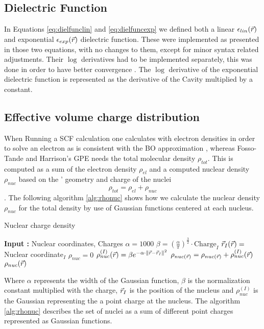 \documentclass[../master_thesis.tex]{subfiles}
\begin{document}
\subsection{Dielectric Function}
In Equations \ref{eq:dielfunclin} and \ref{eq:dielfuncexp} we defined both a
linear $\epsilon_{lin}(\vec{r})$ and exponential $\epsilon_{exp}(\vec{r})$ dielectric function. These were implemented as presented
in those two equations, with no changes to them, except for minor syntax related
adjustments. Their $\log$ derivatives had to be implemented separately,
this was done in order to have better convergence \cite{FossoTande:2013ka}. The
$\log$ derivative of the exponential dielectric function is represented as the
derivative of the Cavity multiplied by a constant.

\subsection{Effective volume charge distribution}
When Running a \ac{SCF} calculation one calculates with electron densities in order
to solve an electron \SE as is consistent with the \ac{BO} approximation
\cite{Cramer:2004, Konishi:2009}, whereas Fosso-Tande and Harrison's \ac{GPE}
needs the total molecular density $\rho_{tot}$. This is computed as a sum of the electron
density $\rho_{el}$ and a computed nuclear density $\rho_{nuc}$ based on the '
geometry and charge of the nuclei
\begin{equation}
  \rho_{tot} = \rho_{el} + \rho_{nuc}
\end{equation}.
The following algorithm \ref{alg:rhonuc} shows how we calculate the nuclear
density $\rho_{nuc}$ for the total density by use of Gaussian functions centered at
each nucleus.
\begin{algorithm}
  \caption{Nuclear charge density}\label{alg:rhonuc}
  \begin{algorithmic}
    \STATE \textbf{Input :} Nuclear coordinates, Charges
    \STATE $\alpha = 1000$
    \STATE $\beta = (\frac{\alpha}{\pi})^{\frac{3}{2}} \cdot \text{Charge}_I$
    \STATE $\vec{r}_I(\vec{r}) =$ Nuclear coordinate$_I$
    \STATE $\rho_{nuc} = 0$
    \STATE $\rho_{nuc}^{(I)}(\vec{r}) = \beta e^{-\alpha\cdot\lVert\vec{r} -\vec{r}_I\rVert^2}$
    \STATE $\rho_{nuc(\vec{r})} = \rho_{nuc(\vec{r})} + \rho_{nuc}^{(I)}(\vec{r})$
    \ENDFOR
    \RETURN $\rho_{nuc}(\vec{r})$
  \end{algorithmic}
\end{algorithm}

Where $\alpha$ represents the width of the Gaussian function, $\beta$ is the normalization
constant multiplied with the charge, $\vec{r}_I$ is the position of the nucleus and
$\rho_{nuc}^{(I)}$ is the Gaussian representing the a point charge at the nucleus.
The algorithm \ref{alg:rhonuc} describes the set of nuclei as a sum of different point charges
represented as Gaussian functions.
\end{document}
